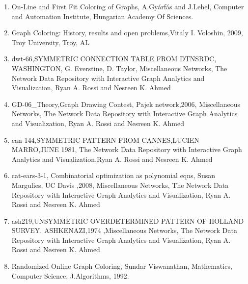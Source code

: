 \documentclass{article}
\begin{document}
\begin{enumerate}
	
	\item On-Line and First Fit Coloring of Graphs, A.Gyárfás and J.Lehel, Computer and Automation Institute, Hungarian Academy Of Sciences. 
	
	\item Graph Coloring: History, results and open problems,Vitaly I. Voloshin, 2009, Troy University, Troy, AL

	\item dwt-66,SYMMETRIC CONNECTION TABLE FROM DTNSRDC, WASHINGTON, G. Everstine, D. Taylor, Miscellaneous Networks,
			 The Network Data Repository with Interactive Graph Analytics and Visualization, Ryan A. Rossi and Nesreen K. Ahmed

	\item GD-06\_Theory,Graph Drawing Contest, Pajek network,2006, Miscellaneous Networks,
			 The Network Data Repository with Interactive Graph Analytics and Visualization, Ryan A. Rossi and Nesreen K. Ahmed

	\item can-144,SYMMETRIC PATTERN FROM CANNES,LUCIEN MARRO,JUNE 1981,
 			The Network Data Repository with Interactive Graph Analytics and Visualization,Ryan A. Rossi and Nesreen K. Ahmed

	\item cat-ears-3-1, Combinatorial optimization as polynomial eqns, Susan Margulies, UC Davis ,2008, Miscellaneous Networks,
			 The Network Data Repository with Interactive Graph Analytics and Visualization, Ryan A. Rossi and Nesreen K. Ahmed

	\item ash219,UNSYMMETRIC OVERDETERMINED PATTERN OF HOLLAND SURVEY. ASHKENAZI,1974 ,Miscellaneous Networks,
			 The Network Data Repository with Interactive Graph Analytics and Visualization, Ryan A. Rossi and Nesreen K. Ahmed


  	\item Randomized Online Graph Coloring, Sundar Viswanathan, Mathematics, Computer Science, J.Algorithms, 1992.
\end{enumerate}




\newpage
\end{document}
